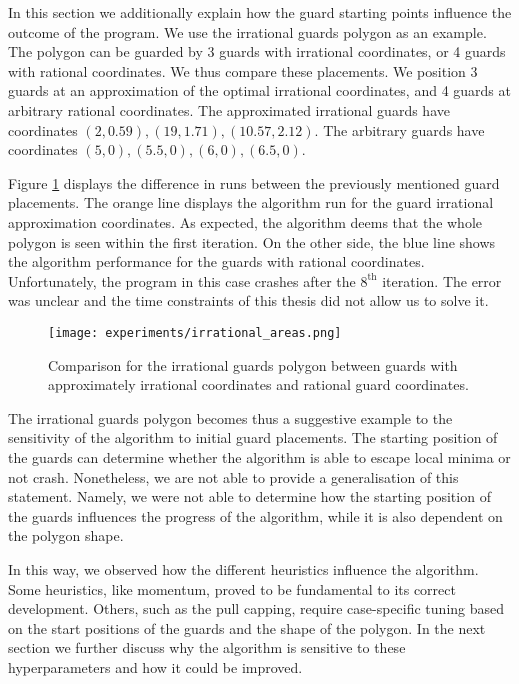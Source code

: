 In this section we  additionally explain how the guard starting points influence the outcome of the program. We  use the irrational guards polygon \cite{abrahamsen2021art} as an example.
The polygon can be guarded by 3 guards with irrational coordinates, or 4 guards with rational coordinates. We  thus compare these placements. We  position 3 guards at an approximation of the optimal irrational coordinates, and 4 guards at arbitrary rational coordinates. The approximated irrational guards  have coordinates $(2, 0.59), (19, 1.71), (10.57, 2.12)$. The arbitrary guards  have coordinates $(5, 0), (5.5, 0), (6, 0), (6.5, 0)$.

Figure \ref{fig:irrational} displays the difference in runs between the previously mentioned guard placements. The orange line displays the algorithm run for the guard irrational approximation coordinates. As expected, the algorithm deems that the whole polygon is seen within the first iteration. On the other side, the blue line shows the algorithm performance for the guards with rational coordinates. Unfortunately, the program in this case crashes after the $8^{\text{th}}$ iteration. The error was unclear and the time constraints of this thesis did not allow us to solve it.

\begin{figure}[!h]
    \centering
    \texttt{[image: experiments/irrational\_areas.png]}
    \caption{Comparison for the irrational guards polygon between guards with approximately irrational coordinates and rational guard coordinates.}
    \label{fig:irrational}
\end{figure}

The irrational guards polygon becomes thus a suggestive example to the sensitivity of the algorithm to initial guard placements. The starting position of the guards can determine whether the algorithm is able to escape local minima or not crash. Nonetheless, we are not able to provide a generalisation of this statement. Namely, we were not able to determine how the starting position of the guards influences the progress of the algorithm, while it is also dependent on the polygon shape.

In this way, we observed how the different heuristics influence the algorithm. Some heuristics, like momentum, proved to be fundamental to its correct development. Others, such as the pull capping, require case-specific tuning based on the start positions of the guards and the shape of the polygon.
In the next section we further discuss why the algorithm is sensitive to these hyperparameters and how it could be improved.